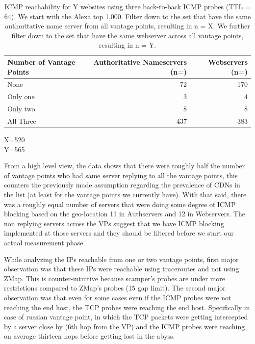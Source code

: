 \begin{table}
\small

    \begin{center}

    \begin{tabular}{|l|r|r|} \hline
        Number of Vantage Points &
        Authoritative Nameservers 
        (n=) &
        Webservers
        (n=)

        \\ \hline

        None    & 72 & 170 \\ \hline
        Only one & 3 & 4 \\ \hline
        Only two & 8 & 8 \\ \hline
        All Three & 437 & 383 \\ \hline
       
       
    \end{tabular}

    \caption{ICMP reachability for Y websites using three back-to-back ICMP
        probes (TTL = 64). We start with the
        Alexa top 1,000.  Filter down to the set that have the same
        authoritative name server from all vantage points, resulting in n =  X.
        We further filter down to the set that have the same webserver across
    all vantage points, resulting in n = Y.}
    \label{tab:ICMPreachabilityacrossvantages}

    \end{center}
    X=520\\
    Y=565
    
\end{table}

From a high level view, the data shows that there were roughly half the number of vantage points who had same server replying to all the vantage points, this counters the previously made assumption regarding the prevalence of CDNs in the list (at least for the vantage points we currently have). With that said, there was a roughly equal number of servers that were doing some degree of ICMP blocking based on the geo-location 11 in Authservers and 12 in Webservers. The non replying servers across the VPs suggest that we have ICMP blocking implemented at those servers and they should be filtered before we start our actual measurement phase.

While analyzing the IPs reachable from one or two vantage points, first major observation was that these IPs were reachable using traceroutes and not using ZMap. This is counter-intuitive because scamper's probes are under more restrictions compared to ZMap's probes (15 gap limit). The second major observation was that even for some cases even if the ICMP probes were not reaching the end host, the TCP probes were reaching the end host. Specifically in case of russian vantage point, in which the TCP packets were getting intercepted by a server close by (6th hop from the VP) and the ICMP probes were reaching on average thirteen hops before getting lost in the abyss. 

